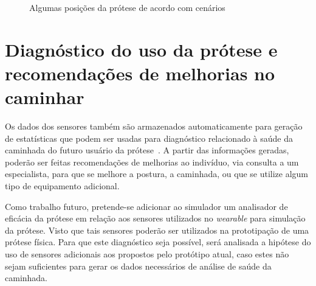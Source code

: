 \begin{figure}[h]
	\caption{\label{fig:hardware_poses}Algumas posições da prótese de acordo com cenários}
	\begin{center}
	\end{center}
\end{figure}


\section{Diagnóstico do uso da prótese e recomendações de melhorias no caminhar}\label{sec:metodo_diagnostico}

Os dados dos sensores também são armazenados automaticamente para geração de estatísticas que podem ser usadas para diagnóstico relacionado à saúde da caminhada do futuro usuário da prótese~\cite{SabatiniMSC05}. 
A partir das informações geradas, poderão ser feitas recomendações de melhorias ao indivíduo, via consulta a um especialista, para que se melhore a postura, a caminhada, ou que se utilize algum tipo de equipamento adicional. 

Como trabalho futuro, pretende-se adicionar ao simulador um analisador de eficácia da prótese em relação aos sensores utilizados no \textit{wearable} para simulação da prótese. Visto que tais sensores poderão ser utilizados na prototipação de uma prótese física.  
Para que este diagnóstico seja possível, será analisada a hipótese do uso de sensores adicionais aos propostos pelo protótipo atual, caso estes não sejam suficientes para gerar os dados necessários de análise de saúde da caminhada.